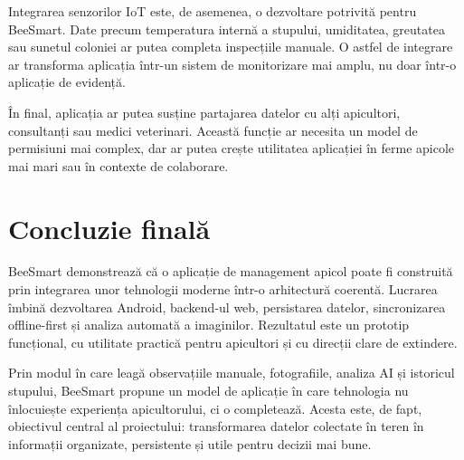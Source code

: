 Integrarea senzorilor IoT este, de asemenea, o dezvoltare potrivită pentru BeeSmart. Date precum temperatura internă a stupului, umiditatea, greutatea sau sunetul coloniei ar putea completa inspecțiile manuale. O astfel de integrare ar transforma aplicația într-un sistem de monitorizare mai amplu, nu doar într-o aplicație de evidență.

În final, aplicația ar putea susține partajarea datelor cu alți apicultori, consultanți sau medici veterinari. Această funcție ar necesita un model de permisiuni mai complex, dar ar putea crește utilitatea aplicației în ferme apicole mai mari sau în contexte de colaborare.

\section{Concluzie finală}

BeeSmart demonstrează că o aplicație de management apicol poate fi construită prin integrarea unor tehnologii moderne într-o arhitectură coerentă. Lucrarea îmbină dezvoltarea Android, backend-ul web, persistarea datelor, sincronizarea offline-first și analiza automată a imaginilor. Rezultatul este un prototip funcțional, cu utilitate practică pentru apicultori și cu direcții clare de extindere.

Prin modul în care leagă observațiile manuale, fotografiile, analiza AI și istoricul stupului, BeeSmart propune un model de aplicație în care tehnologia nu înlocuiește experiența apicultorului, ci o completează. Acesta este, de fapt, obiectivul central al proiectului: transformarea datelor colectate în teren în informații organizate, persistente și utile pentru decizii mai bune.
